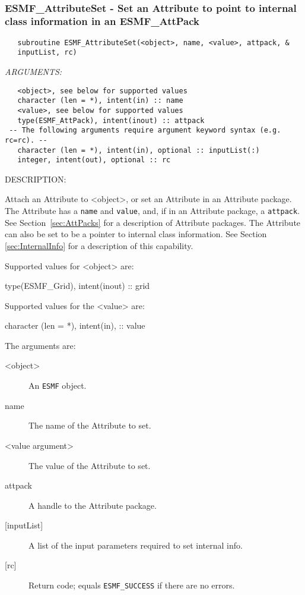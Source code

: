    
 
\mbox{}\hrulefill\ 
 
\subsubsection [ESMF\_AttributeSet] {ESMF\_AttributeSet - Set an Attribute to point to internal class information in an ESMF\_AttPack}


  
\begin{verbatim}   subroutine ESMF_AttributeSet(<object>, name, <value>, attpack, &
   inputList, rc)\end{verbatim}{\em ARGUMENTS:}
\begin{verbatim}   <object>, see below for supported values
   character (len = *), intent(in) :: name
   <value>, see below for supported values
   type(ESMF_AttPack), intent(inout) :: attpack
 -- The following arguments require argument keyword syntax (e.g. rc=rc). --
   character (len = *), intent(in), optional :: inputList(:)
   integer, intent(out), optional :: rc\end{verbatim}
{\sf DESCRIPTION:\\ }


   Attach an Attribute to <object>, or set an Attribute in an
   Attribute package. The Attribute has a {\tt name} and {\tt value},
   and, if in an Attribute package, a {\tt attpack}.
   See Section~\ref{sec:AttPacks} for a description of Attribute packages.
   The Attribute can
   also be set to be a pointer to internal class information. See Section
   \ref{sec:InternalInfo} for a description of this capability.
  
   Supported values for <object> are:
   \begin{description}
   \item type(ESMF\_Grid), intent(inout) :: grid
   \end{description}
  
   Supported values for the <value> are:
   \begin{description}
   \item character (len = *), intent(in), :: value
   \end{description}
  
   The arguments are:
   \begin{description}
   \item [<object>]
   An {\tt ESMF} object.
   \item [name]
   The name of the Attribute to set.
   \item [<value argument>]
   The value of the Attribute to set.
   \item [attpack]
   A handle to the Attribute package.
   \item [{[inputList]}]
   A list of the input parameters required to set internal info.
   \item [{[rc]}]
   Return code; equals {\tt ESMF\_SUCCESS} if there are no errors.
   \end{description}
  

